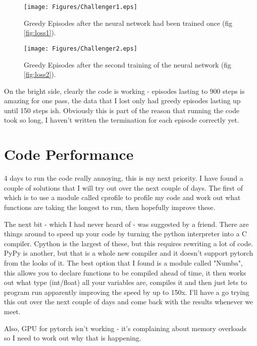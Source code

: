 \documentclass[11.7pt]{article}
\begin{document}
\begin{figure}[ht]
   \begin{minipage}[b]{0.48\linewidth}
      \centering
      \texttt{[image: Figures/Challenger1.eps]}
      \caption{Greedy Episodes after the neural network had been trained once (fig \ref{fig:loss1}).}
      \label{fig:challenger1}
   \end{minipage}
   \hspace{0.2cm}
   \begin{minipage}[b]{0.48\linewidth}
      \centering
      \texttt{[image: Figures/Challenger2.eps]}
      \caption{Greedy Episodes after the second training of the neural network (fig \ref{fig:loss2}).}
      \label{fig:challenger2}
   \end{minipage}
\end{figure}

On the bright side, clearly the code is working - episodes lasting to 900 steps is amazing for one pass, the data that I lost only had greedy episodes lasting up until 150 steps ish. Obviously this is part of the reason that running the code took so long, I haven't written the termination for each episode correctly yet.

\section{Code Performance}
4 days to run the code really annoying, this is my next priority. I have found a couple of solutions that I will try out over the next couple of days. The first of which is to use a module called cprofile to profile my code and work out what functions are taking the longest to run, then hopefully improve these.

The next bit - which I had never heard of - was suggested by a friend. There are things around to speed up your code by turning the python interpreter into a C compiler. Cpython is the largest of these, but this requires rewriting a lot of code. PyPy is another, but that is a whole new compiler and it doesn't support pytorch from the looks of it. The best option that I found is a module called "Numba", this allows you to declare functions to be compiled ahead of time, it then works out what type (int/float) all your variables are, compiles it and then just lets to program run apparently improving the speed by up to 150x. I'll have a go trying this out over the next couple of days and come back with the results whenever we meet.

Also, GPU for pytorch isn't working - it's complaining about memory overloads so I need to work out why that is happening.
\end{document}
